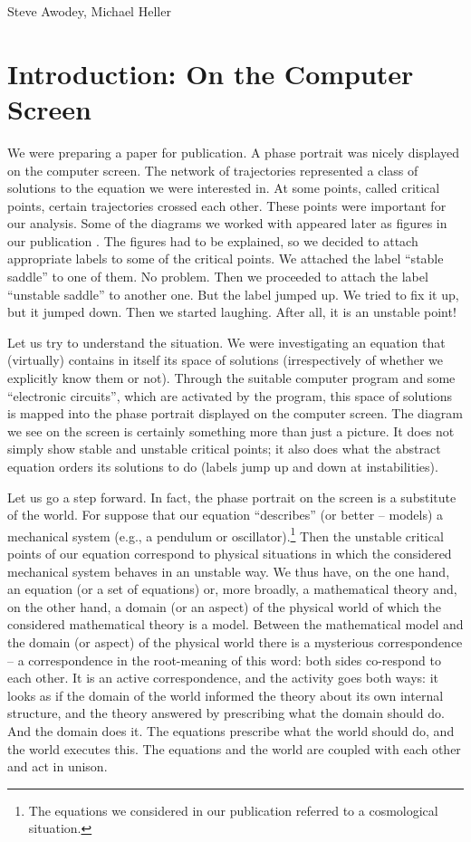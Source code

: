 \begin{artengenv2auth}{Steve Awodey, Michael Heller}
	



\section{Introduction: On the Computer Screen}
\lettrine[loversize=0.13,lines=2,lraise=-0.03,nindent=0em,findent=0.2pt]%
{W}{}e were preparing a paper for publication. A phase portrait was nicely displayed on the computer screen. The network of trajectories represented a class of solutions to the equation we were interested in. At some points, called critical points, certain trajectories crossed each other. These points were important for our analysis. Some of the diagrams we worked with appeared later as figures in our publication \parencite{GRG}. The figures had to be explained, so we decided to attach appropriate labels to some of the critical points. We attached the label ``stable saddle'' to one of them. No problem. Then we proceeded to attach the label ``unstable saddle'' to another one. But the label jumped up. We tried to fix it up, but it jumped down. Then we started laughing. After all, it is an unstable point!

Let us try to understand the situation. We were investigating an equation that (virtually) contains in itself its space of solutions (irrespectively of whether we explicitly know them or not). Through the suitable computer program and some ``electronic circuits'', which are activated by the program, this space of solutions is mapped into the phase portrait displayed on the computer screen. The diagram we see on the screen is certainly something more than just a picture. It does not simply show stable and unstable critical points; it also does what the abstract equation orders its solutions to do (labels jump up and down at instabilities).

Let us go a step forward. In fact, the phase portrait on the screen is a substitute of the world. For suppose that our equation ``describes'' (or better -- models) a mechanical system (e.g., a pendulum or oscillator).\footnote{The equations we considered in our publication referred to a cosmological situation.}  Then the unstable critical points of our equation correspond to physical situations in which the considered mechanical system behaves in an unstable way. We thus have, on the one hand, an equation (or a set of equations) or, more broadly, a mathematical theory and, on the other hand, a domain (or an aspect) of the physical world of which the considered mathematical theory is a model. Between the mathematical model and the domain (or aspect) of the physical world there is a mysterious correspondence -- a correspondence in the root-meaning of this word: both sides co-respond to each other. It is an active correspondence, and the activity goes both ways: it looks as if the domain of the world informed the theory about its own internal structure, and the theory answered by prescribing what the domain should do. And the domain does it. The equations prescribe what the world should do, and the world executes this. The equations and the world  are coupled with each other and act in unison.


\end{artengenv2auth}

